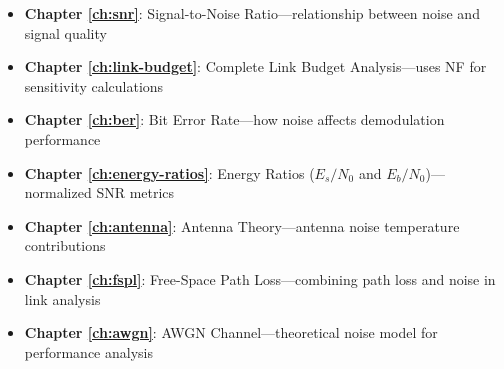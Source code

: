 \begin{itemize}
\item \textbf{Chapter \ref{ch:snr}}: Signal-to-Noise Ratio---relationship between noise and signal quality
\item \textbf{Chapter \ref{ch:link-budget}}: Complete Link Budget Analysis---uses NF for sensitivity calculations
\item \textbf{Chapter \ref{ch:ber}}: Bit Error Rate---how noise affects demodulation performance
\item \textbf{Chapter \ref{ch:energy-ratios}}: Energy Ratios ($E_s/N_0$ and $E_b/N_0$)---normalized SNR metrics
\item \textbf{Chapter \ref{ch:antenna}}: Antenna Theory---antenna noise temperature contributions
\item \textbf{Chapter \ref{ch:fspl}}: Free-Space Path Loss---combining path loss and noise in link analysis
\item \textbf{Chapter \ref{ch:awgn}}: AWGN Channel---theoretical noise model for performance analysis
\end{itemize}
